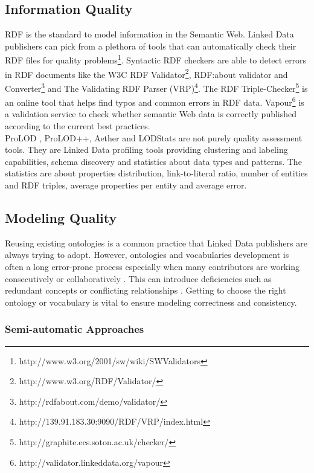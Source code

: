 \documentclass[onecolumn, crcready]{iosart2c}
\begin{document}
\subsection{Information Quality}

RDF is the standard to model information in the Semantic Web. Linked Data publishers can pick from a plethora of tools that can automatically check their RDF files for quality problems\footnote{http://www.w3.org/2001/sw/wiki/SWValidators}. Syntactic RDF checkers are able to detect errors in RDF documents like the W3C RDF Validator\footnote{http://www.w3.org/RDF/Validator/}, RDF:about validator and Converter\footnote{http://rdfabout.com/demo/validator/} and The Validating RDF Parser (VRP)\footnote{http://139.91.183.30:9090/RDF/VRP/index.html}. The RDF Triple-Checker\footnote{http://graphite.ecs.soton.ac.uk/checker/} is an online tool that helps find typos and common errors in RDF data. Vapour\footnote{http://validator.linkeddata.org/vapour} \cite{Berrueta08cookinghttp} is a validation service to check whether semantic Web data is correctly published according to the current best practices\cite{tim:linkedata}.\\
ProLOD \cite{Bohm2010}, ProLOD++\cite{6816740}, Aether \cite{makela-aether-2014} and LODStats\cite{demter-2012-ekaw} are not purely quality assessment tools. They are Linked Data profiling tools providing clustering and labeling capabilities, schema discovery and statistics about data types and patterns. The statistics are about properties distribution, link-to-literal ratio, number of entities and RDF triples, average properties per entity and average error.

\subsection{Modeling Quality}

Reusing existing ontologies is a common practice that Linked Data publishers are always trying to adopt. However, ontologies and vocabularies development is often a long error-prone process especially when many contributors are working consecutively or collaboratively \cite{Suominen2013}. This can introduce deficiencies such as redundant concepts or conflicting relationships \cite{harpring_introduction_2010}. Getting to choose the right ontology or vocabulary is vital to ensure modeling correctness and consistency.\\

\subsubsection{Semi-automatic Approaches}
\end{document}
